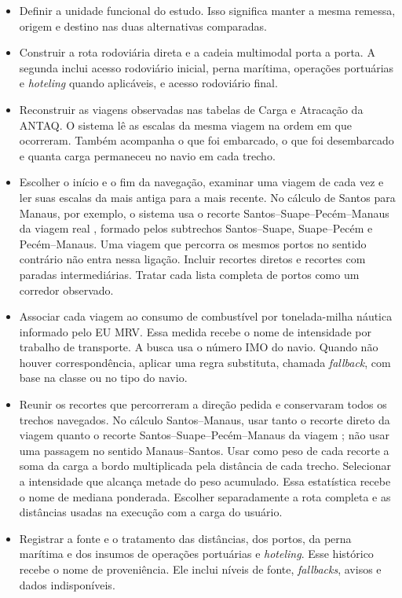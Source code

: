 \begin{itemize}
  \item Definir a unidade funcional do estudo. Isso significa manter a mesma remessa, origem e destino nas duas alternativas comparadas.
  \item Construir a rota rodoviária direta e a cadeia multimodal porta a porta. A segunda inclui acesso rodoviário inicial, perna marítima, operações portuárias e \emph{hoteling} quando aplicáveis, e acesso rodoviário final.
  \item Reconstruir as viagens observadas nas tabelas de Carga e Atracação da ANTAQ. O sistema lê as escalas da mesma viagem na ordem em que ocorreram. Também acompanha o que foi embarcado, o que foi desembarcado e quanta carga permaneceu no navio em cada trecho.
  \item Escolher o início e o fim da navegação, examinar uma viagem de cada vez e ler suas escalas da mais antiga para a mais recente. No cálculo de Santos para Manaus, por exemplo, o sistema usa o recorte Santos--Suape--Pecém--Manaus da viagem real , formado pelos subtrechos Santos--Suape, Suape--Pecém e Pecém--Manaus. Uma viagem que percorra os mesmos portos no sentido contrário não entra nessa ligação. Incluir recortes diretos e recortes com paradas intermediárias. Tratar cada lista completa de portos como um corredor observado.
  \item Associar cada viagem ao consumo de combustível por tonelada-milha náutica informado pelo EU MRV. Essa medida recebe o nome de intensidade por trabalho de transporte. A busca usa o número IMO do navio. Quando não houver correspondência, aplicar uma regra substituta, chamada \emph{fallback}, com base na classe ou no tipo do navio.
  \item Reunir os recortes que percorreram a direção pedida e conservaram todos os trechos navegados. No cálculo Santos--Manaus, usar tanto o recorte direto da viagem  quanto o recorte Santos--Suape--Pecém--Manaus da viagem ; não usar uma passagem no sentido Manaus--Santos. Usar como peso de cada recorte a soma da carga a bordo multiplicada pela distância de cada trecho. Selecionar a intensidade que alcança metade do peso acumulado. Essa estatística recebe o nome de mediana ponderada. Escolher separadamente a rota completa e as distâncias usadas na execução com a carga do usuário.
  \item Registrar a fonte e o tratamento das distâncias, dos portos, da perna marítima e dos insumos de operações portuárias e \emph{hoteling}. Esse histórico recebe o nome de proveniência. Ele inclui níveis de fonte, \emph{fallbacks}, avisos e dados indisponíveis.

\end{itemize}
